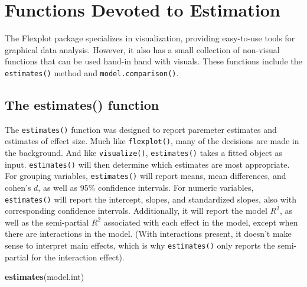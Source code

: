 \documentclass[,]{book}
\newenvironment{Shaded}{\begin{snugshade}}{\end{snugshade}}
\newcommand{\KeywordTok}[1]{\textcolor[rgb]{0.13,0.29,0.53}{\textbf{#1}}}
\newcommand{\NormalTok}[1]{#1}
\begin{document}
\chapter*{Functions Devoted to
Estimation}\label{functions-devoted-to-estimation}

The Flexplot package specializes in visualization, providing easy-to-use
tools for graphical data analysis. However, it also has a small
collection of non-visual functions that can be used hand-in hand with
visuals. These functions include the \texttt{estimates()} method and
\texttt{model.comparison()}.

\section*{The estimates() function}\label{the-estimates-function}

The \texttt{estimates()} function was designed to report paremeter
estimates and estimates of effect size. Much like \texttt{flexplot()},
many of the decisions are made in the background. And like
\texttt{visualize()}, \texttt{estimates()} takes a fitted object as
input. \texttt{estimates()} will then determine which estimates are most
appropriate. For grouping variables, \texttt{estimates()} will report
means, mean differences, and cohen's \(d\), as well as 95\% confidence
intervals. For numeric variables, \texttt{estimates()} will report the
intercept, slopes, and standardized slopes, also with corresponding
confidence intervals. Additionally, it will report the model \(R^2\), as
well as the semi-partial \(R^2\) associated with each effect in the
model, except when there are interactions in the model. (With
interactions present, it doesn't make sense to interpret main effects,
which is why \texttt{estimates()} only reports the semi-partial for the
interaction effect).

\begin{Shaded}
\begin{Highlighting}[]
\KeywordTok{estimates}\NormalTok{(model.int)}
\end{Highlighting}
\end{Shaded}
\end{document}
